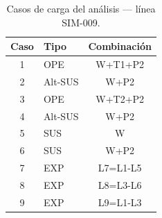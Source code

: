 \begin{table}[htbp]
  \centering
  \small
  \caption{Casos de carga del análisis — línea SIM-009.}
  \label{tab:casos}
  \begin{tabular}{clc}
    \toprule
    Caso & Tipo & Combinaci\'on \\
    \midrule
    1 & OPE & W+T1+P2 \\
    2 & Alt-SUS & W+P2 \\
    3 & OPE & W+T2+P2 \\
    4 & Alt-SUS & W+P2 \\
    5 & SUS & W \\
    6 & SUS & W+P2 \\
    7 & EXP & L7=L1-L5 \\
    8 & EXP & L8=L3-L6 \\
    9 & EXP & L9=L1-L3 \\
    \bottomrule
  \end{tabular}
\end{table}
